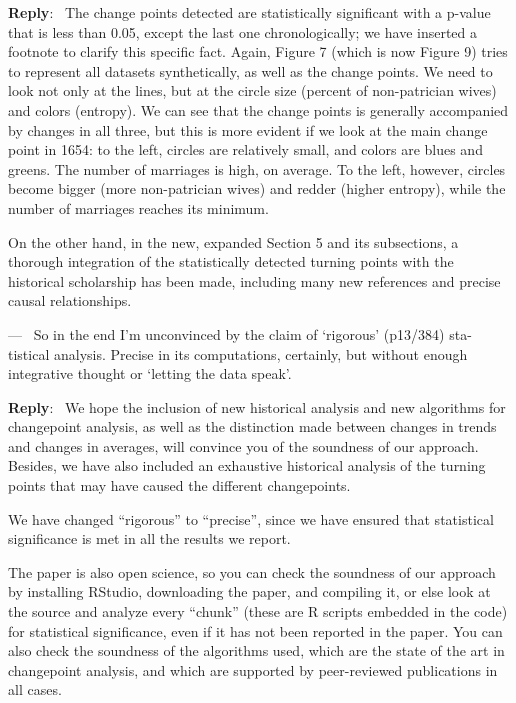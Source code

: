 \documentclass[11pt]{article}
\newcounter{reviewer}
\newcounter{point}[reviewer]
\renewcommand{\thepoint}{P\,\thereviewer.\arabic{point}}
\newenvironment{point}
   {\refstepcounter{point} \bigskip \noindent {\textbf{Reviewer~Point~\thepoint} } ---\ }
   {\par }
\newenvironment{reply}
   {\medskip \noindent \begin{sf}\textbf{Reply}:\  }
   {\medskip \end{sf}}
\begin{document}
\begin{reply}
  The change points detected are statistically significant with a p-value that
  is less than 0.05, except the last one
  chronologically; we have inserted a footnote to clarify this specific
  fact. Again, Figure 7 (which is now Figure 9) tries to represent all datasets
  synthetically, as well as the change points. We need to look not only at the
  lines, but at the circle size (percent of non-patrician wives) and colors
  (entropy). We can see that the change points is generally accompanied by
  changes in all three, but this is more evident if we look at the main change
  point in 1654: to the left, circles are relatively small, and colors are
  blues and greens. The number of marriages is high, on average. To the left,
  however, circles become bigger (more non-patrician wives) and redder (higher
  entropy), while the number of marriages reaches its minimum.

  On the other hand, in the new, expanded Section 5 and its subsections, a
  thorough integration of the statistically detected turning points with the
  historical scholarship has been made, including many new references and
  precise causal relationships.
\end{reply}


\begin{point}
So in the end I’m unconvinced by the claim of ‘rigorous’ (p13/384) sta-
tistical analysis. Precise in its computations, certainly, but without enough
integrative thought or ‘letting the data speak’.
\end{point}

\begin{reply}
  We hope the inclusion of new historical analysis and new algorithms for
  changepoint analysis, as well as the distinction made between changes in
  trends and changes in averages, will convince you of the soundness of our
  approach. Besides, we have also included an exhaustive historical analysis of
  the turning points that may have caused the different changepoints.

  We have changed ``rigorous'' to ``precise'', since we have ensured that
  statistical significance is met in all the results we report.

  The paper is also open science, so you can check the soundness of our approach
  by installing RStudio, downloading the paper, and compiling it, or else look
  at the source and analyze every ``chunk'' (these are R scripts embedded in the
  code) for statistical significance, even if it has not been reported in the
  paper. You can also check the soundness of the algorithms used, which are the
  state of the art in changepoint analysis, and which are supported by
  peer-reviewed publications in all cases.
\end{reply}
\end{document}
